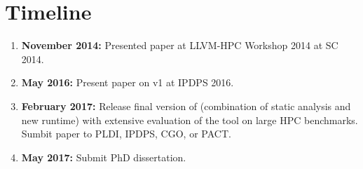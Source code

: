 \section{Timeline}
\label{sec:timeline}

\begin{enumerate}
\item \textbf{November 2014:} Presented paper at LLVM-HPC Workshop 2014 at SC
  2014.
\item \textbf{May 2016:} Present paper on \archer v1 at IPDPS 2016.
\item \textbf{February 2017:} Release final version of \archer
  (combination of static analysis and new runtime) with extensive evaluation
  of the tool on large HPC benchmarks.
  Sumbit paper to PLDI, IPDPS, CGO, or PACT.
\item \textbf{May 2017:} Submit PhD dissertation.
\end{enumerate}


